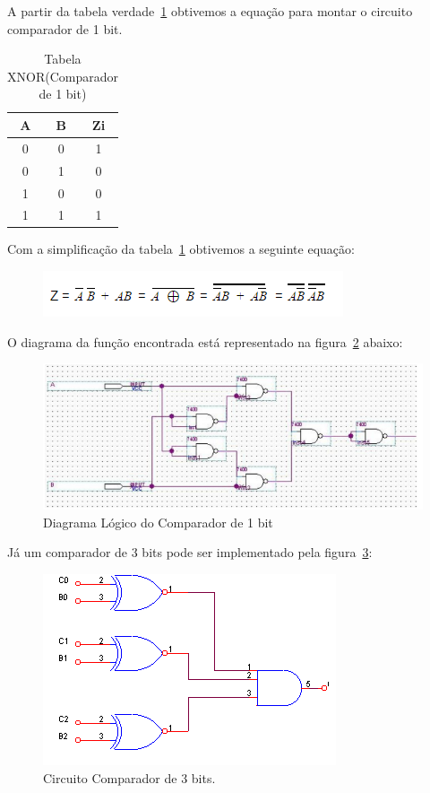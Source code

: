 \documentclass[12pt]{article}
\begin{document}
A partir da tabela verdade~\ref{tab:XNOR} obtivemos a equação para montar o circuito comparador de 1 bit.
\begin{table}[H]
	\centering
	\caption{Tabela XNOR(Comparador de 1 bit)}
	\begin{tabular}{|c|c|c|}
		\hline
		\multicolumn{1}{|c}{A} & \multicolumn{1}{|c|}{B} & \multicolumn{1}{c|}{Zi}\\
		\hline
		0 & 0 & 1\\
		0 & 1 & 0\\
		1 & 0 & 0\\
		1 & 1 & 1\\
		\hline
	\end{tabular}
	\label{tab:XNOR}
\end{table}
Com a simplificação da tabela~\ref{tab:XNOR} obtivemos a seguinte equação: 
\begin{figure}[H]
	\centering
	\includegraphics[width=.5\textwidth]{simpxnor.png}
	\label{fig:simpxnor}	
\end{figure}
O diagrama da função encontrada está representado na figura~\ref{fig:dlc1} abaixo:
\begin{figure}[H]
	\centering
	\includegraphics[width=.5\textwidth]{dlc1bit.png}
	\caption{Diagrama Lógico do Comparador de 1 bit}
	\label{fig:dlc1}	
\end{figure}
Já um comparador de 3 bits pode ser implementado pela figura~\ref{fig:cc3b}:
\begin{figure}[H]
	\centering
	\includegraphics[width=.5\textwidth]{cc3bitex.png}
	\caption{Circuito Comparador de 3 bits.}
	\label{fig:cc3b}
\end{figure}
\end{document}
